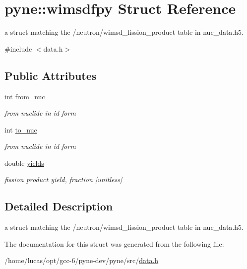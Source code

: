 \hypertarget{structpyne_1_1wimsdfpy}{}\section{pyne\+:\+:wimsdfpy Struct Reference}
\label{structpyne_1_1wimsdfpy}


a struct matching the \textquotesingle{}/neutron/wimsd\+\_\+fission\+\_\+product\textquotesingle{} table in nuc\+\_\+data.\+h5.  




{\ttfamily \#include $<$data.\+h$>$}

\subsection*{Public Attributes}
\begin{DoxyCompactItemize}
\item 
int \hyperlink{structpyne_1_1wimsdfpy_a7521e458719ebb8ed23f4912ec4555f8}{from\+\_\+nuc}\hypertarget{structpyne_1_1wimsdfpy_a7521e458719ebb8ed23f4912ec4555f8}{}\label{structpyne_1_1wimsdfpy_a7521e458719ebb8ed23f4912ec4555f8}

\begin{DoxyCompactList}\small\item\em from nuclide in id form \end{DoxyCompactList}\item 
int \hyperlink{structpyne_1_1wimsdfpy_a2a0f913a64fb76c5c82e1212df7fbb6c}{to\+\_\+nuc}\hypertarget{structpyne_1_1wimsdfpy_a2a0f913a64fb76c5c82e1212df7fbb6c}{}\label{structpyne_1_1wimsdfpy_a2a0f913a64fb76c5c82e1212df7fbb6c}

\begin{DoxyCompactList}\small\item\em from nuclide in id form \end{DoxyCompactList}\item 
double \hyperlink{structpyne_1_1wimsdfpy_a1c20eef7a02f2f62dba113cbf24d8bf2}{yields}\hypertarget{structpyne_1_1wimsdfpy_a1c20eef7a02f2f62dba113cbf24d8bf2}{}\label{structpyne_1_1wimsdfpy_a1c20eef7a02f2f62dba113cbf24d8bf2}

\begin{DoxyCompactList}\small\item\em fission product yield, fraction \mbox{[}unitless\mbox{]} \end{DoxyCompactList}\end{DoxyCompactItemize}


\subsection{Detailed Description}
a struct matching the \textquotesingle{}/neutron/wimsd\+\_\+fission\+\_\+product\textquotesingle{} table in nuc\+\_\+data.\+h5. 

The documentation for this struct was generated from the following file\+:\begin{DoxyCompactItemize}
\item 
/home/lucas/opt/gcc-\/6/pyne-\/dev/pyne/src/\hyperlink{data_8h}{data.\+h}\end{DoxyCompactItemize}

